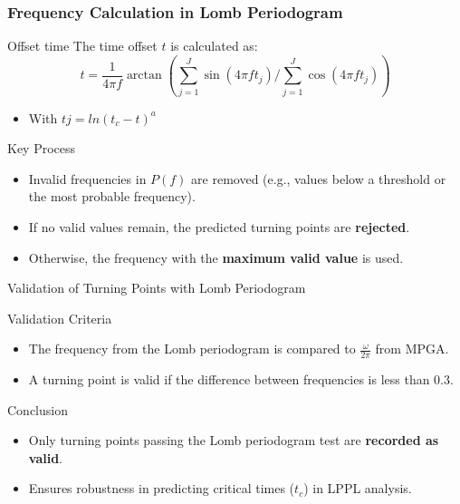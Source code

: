 \documentclass{beamer}
\begin{document}
\begin{frame}
\frametitle{Frequency Calculation in Lomb Periodogram}
    \begin{block}{Offset time}
        The time offset \( t \) is calculated as:
        \[
        t = \frac{1}{4\pi f} \arctan \left( \sum_{j=1}^J \sin(4\pi f t_j) \Big/ \sum_{j=1}^J \cos(4\pi f t_j) \right)
        \]
        \begin{itemize}
            \item With \(tj = ln(t_c - t)^a \)
        \end{itemize}
    \end{block}
    \begin{block}{Key Process}
        \begin{itemize}
            \item Invalid frequencies in \(P(f)\) are removed (e.g., values below a threshold or the most probable frequency).
            \item If no valid values remain, the predicted turning points are \textbf{rejected}.
            \item Otherwise, the frequency with the \textbf{maximum valid value} is used.
        \end{itemize}
    \end{block}
\end{frame}

\begin{frame}{Validation of Turning Points with Lomb Periodogram}
    \begin{block}{Validation Criteria}
        \begin{itemize}
            \item The frequency from the Lomb periodogram is compared to \(\frac{\omega}{2\pi}\) from MPGA.
            \item A turning point is valid if the difference between frequencies is less than \(0.3\).
        \end{itemize}
    \end{block}
    \begin{block}{Conclusion}
        \begin{itemize}
            \item Only turning points passing the Lomb periodogram test are \textbf{recorded as valid}.
            \item Ensures robustness in predicting critical times (\(t_c\)) in LPPL analysis.
        \end{itemize}
    \end{block}
\end{frame}
\end{document}
